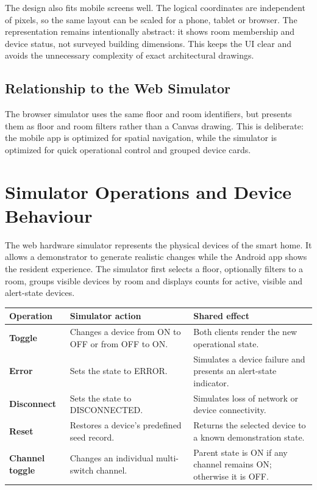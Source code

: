 \documentclass[11pt,a4paper]{article}
\begin{document}
The design also fits mobile screens well. The logical coordinates are independent of pixels, so the same layout can be scaled for a phone, tablet or browser. The representation remains intentionally abstract: it shows room membership and device status, not surveyed building dimensions. This keeps the UI clear and avoids the unnecessary complexity of exact architectural drawings.

\subsection{Relationship to the Web Simulator}
The browser simulator uses the same floor and room identifiers, but presents them as floor and room filters rather than a Canvas drawing. This is deliberate: the mobile app is optimized for spatial navigation, while the simulator is optimized for quick operational control and grouped device cards.

\newpage
\section{Simulator Operations and Device Behaviour}
The web hardware simulator represents the physical devices of the smart home. It allows a demonstrator to generate realistic changes while the Android app shows the resident experience. The simulator first selects a floor, optionally filters to a room, groups visible devices by room and displays counts for active, visible and alert-state devices.

\begin{tabularx}{\textwidth}{>{\bfseries}p{2.2cm}p{5.4cm}X}
\toprule
Operation & Simulator action & Shared effect \\
\midrule
Toggle & Changes a device from ON to OFF or from OFF to ON. & Both clients render the new operational state. \\
Error & Sets the state to ERROR. & Simulates a device failure and presents an alert-state indicator. \\
Disconnect & Sets the state to DISCONNECTED. & Simulates loss of network or device connectivity. \\
Reset & Restores a device's predefined seed record. & Returns the selected device to a known demonstration state. \\
Channel toggle & Changes an individual multi-switch channel. & Parent state is ON if any channel remains ON; otherwise it is OFF. \\
\bottomrule
\end{tabularx}
\end{document}
